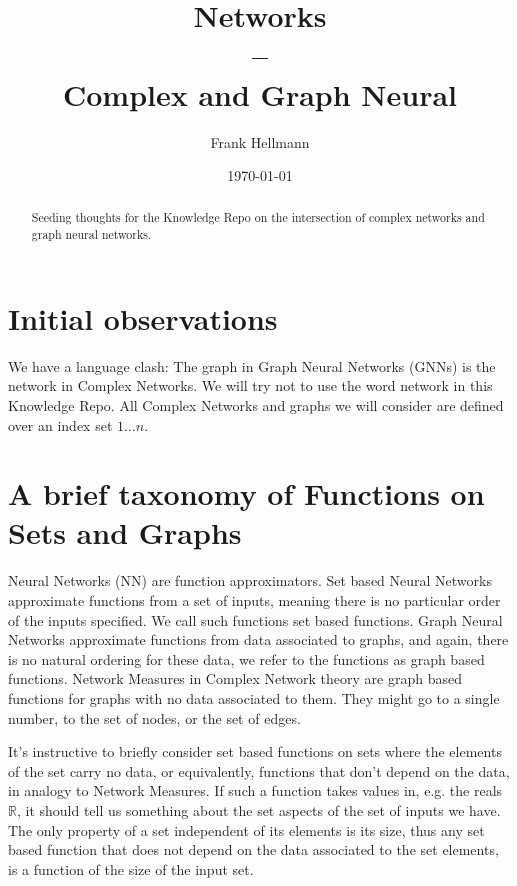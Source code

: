 \documentclass[reprint,twocolumn,amsmath,amssymb,aps]{revtex4-1}
\begin{document}
\title{Networks \\--\\ Complex and Graph Neural}%

\author{Frank Hellmann}

\date{\today}

\begin{abstract}
Seeding thoughts for the Knowledge Repo on the intersection of complex networks and graph neural networks.
\end{abstract}

\maketitle

\section{Initial observations}

We have a language clash: The graph in Graph Neural Networks (GNNs) is the network in Complex Networks. We will try not to use the word network in this Knowledge Repo. All Complex Networks and graphs we will consider are defined over an index set $1 \dots n$.

\section{A brief taxonomy of Functions on Sets and Graphs}

Neural Networks (NN) are function approximators. Set based Neural Networks approximate functions from a set of inputs, meaning there is no particular order of the inputs specified. We call such functions set based functions. Graph Neural Networks approximate functions from data associated to graphs, and again, there is no natural ordering for these data, we refer to the functions as graph based functions. Network Measures in Complex Network theory are graph based functions for graphs with no data associated to them. They might go to a single number, to the set of nodes, or the set of edges.

It's instructive to briefly consider set based functions on sets where the elements of the set carry no data, or equivalently, functions that don't depend on the data, in analogy to Network Measures. If such a function takes values in, e.g. the reals $\mathbb{R}$, it should tell us something about the set aspects of the set of inputs we have. The only property of a set independent of its elements is its size, thus any set based function that does not depend on the data associated to the set elements, is a function of the size of the input set.
\end{document}
